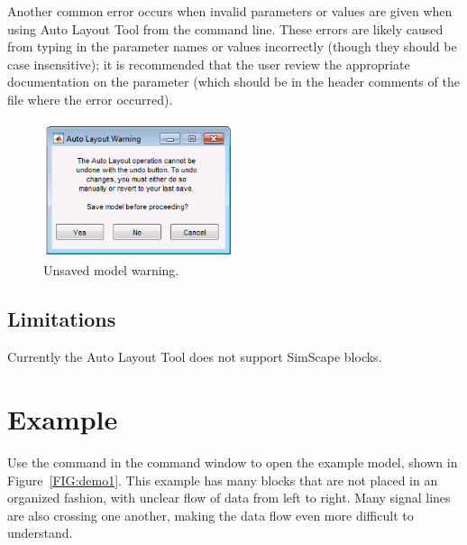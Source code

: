 \documentclass{article}
\makeatletter
\newcommand{\ToolName}{Auto Layout Tool\@\xspace}
\newcommand{\demoName}{\cmd{AutoLayoutDemo}\@\xspace}
\makeatother
\begin{document}
Another common error occurs when invalid parameters or values are given when using \ToolName from the command line.
These errors are likely caused from typing in the parameter names or values incorrectly (though they should be case insensitive); it is recommended that the user review the appropriate documentation on the parameter (which should be in the header comments of the file where the error occurred).

\begin{figure}[!ht]
	\centering
	\includegraphics[width=0.5\textwidth]{../figs/Warning}
	\caption{Unsaved model warning.}
	\label{FIG:warning}
\end{figure}

\subsection{Limitations}
\label{sec:limitations}
Currently the \ToolName does not support SimScape blocks.

\section{Example}

Use the command \demoName in the \Simulink command window to open the example model, shown in Figure~\ref{FIG:demo1}. This example has many blocks that are not placed in an organized fashion, with unclear flow of data from left to right. Many signal lines are also crossing one another, making the data flow even more difficult to understand.
\end{document}
